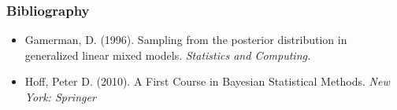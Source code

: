 \documentclass[black]{beamer}
\begin{document}
\begin{frame}
\frametitle{Bibliography}
\begin{itemize}
\item Gamerman, D.  (1996).  Sampling from the posterior distribution in generalized linear mixed models.  \emph{Statistics and Computing.}
\vspace{0.2cm}
\item Hoff, Peter D. (2010).  A First Course in Bayesian Statistical Methods. \emph{New York: Springer}
\end{itemize}
\end{frame}
\end{document}

